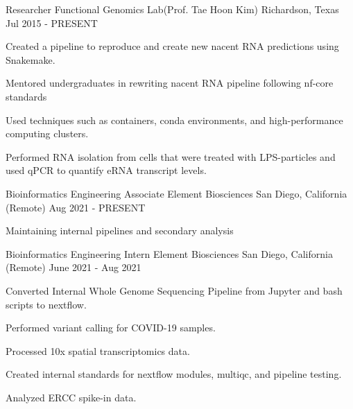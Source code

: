 

\begin{cventries}

	\cventry
	{Researcher} %
	{Functional Genomics Lab(Prof. Tae Hoon Kim)} %
	{Richardson, Texas} %
	{Jul 2015 - PRESENT} %
	{
		\begin{cvitems} %
			\item {Created a pipeline to reproduce and create new nacent RNA
			            predictions using Snakemake.}
			\item {Mentored undergraduates in rewriting nacent RNA pipeline following nf-core standards}
			\item {Used techniques such as containers, conda environments, and
			            high-performance computing clusters.}
			\item {Performed RNA isolation from cells that were treated with LPS-particles and used qPCR to quantify eRNA transcript levels.}
		\end{cvitems}
	}

	\cventry
	{Bioinformatics Engineering Associate} %
	{Element Biosciences} %
	{San Diego, California (Remote)} %
	{Aug 2021 - PRESENT} %
	{
		\begin{cvitems} %
			\item {Maintaining internal pipelines and secondary analysis}
		\end{cvitems}
	}

	\cventry
	{Bioinformatics Engineering Intern} %
	{Element Biosciences} %
	{San Diego, California (Remote)} %
	{June 2021 - Aug 2021} %
	{
		\begin{cvitems} %
			\item {Converted Internal Whole Genome Sequencing Pipeline from Jupyter and bash scripts to nextflow.}
			\item {Performed variant calling for COVID-19 samples.}
			\item {Processed 10x spatial transcriptomics data.}
			\item {Created internal standards for nextflow modules, multiqc, and pipeline testing.}
			\item {Analyzed ERCC spike-in data.}
		\end{cvitems}
	}


\end{cventries}
